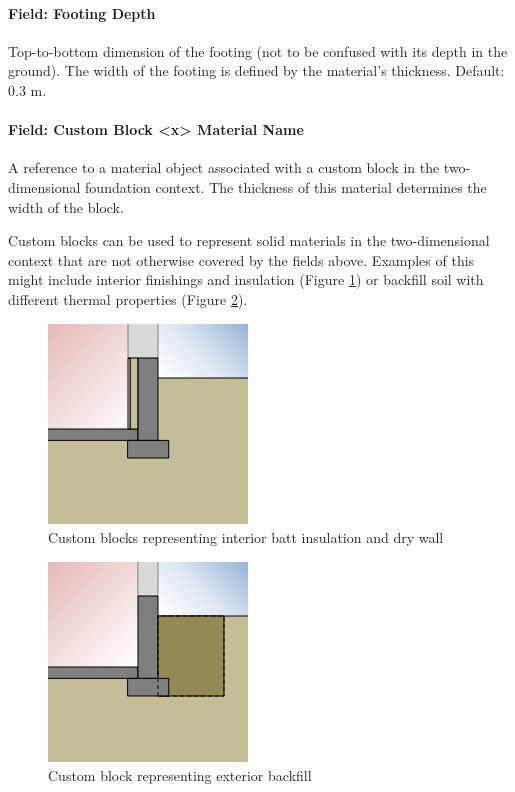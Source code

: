 \paragraph{Field: Footing Depth}

Top-to-bottom dimension of the footing (not to be confused with its
depth in the ground). The width of the footing is defined by the
material's thickness. Default: 0.3 m.

\paragraph{Field: Custom Block \textless{}x\textgreater{} Material
Name}

A reference to a material object associated with a custom block in the
two-dimensional foundation context. The thickness of this material
determines the width of the block.

Custom blocks can be used to represent solid materials in the
two-dimensional context that are not otherwise covered by the fields
above. Examples of this might include interior finishings and insulation
(Figure \ref{fig:cw}) or backfill soil with different thermal properties
(Figure \ref{fig:cf}).

\begin{figure}
\centering
\includegraphics{media/kiva-2d-custom-ex-wall.png}
\caption{Custom blocks representing interior batt insulation and dry
wall\label{fig:cw}}
\end{figure}

\begin{figure}
\centering
\includegraphics{media/kiva-2d-custom-ex-fill.png}
\caption{Custom block representing exterior backfill\label{fig:cf}}
\end{figure}

